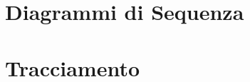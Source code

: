 \section{Diagrammi di Sequenza}

\newpage

\section{Tracciamento}

\newpage

\newpage

\newpage






